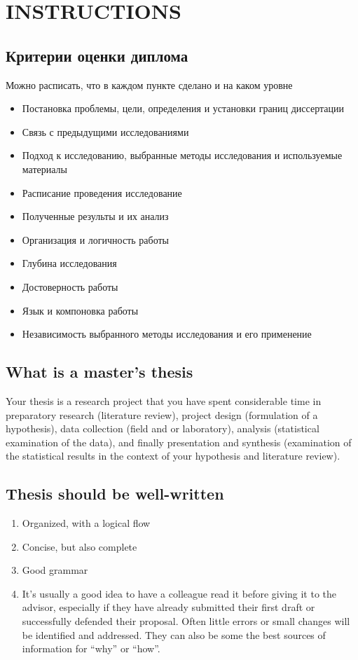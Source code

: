 \section*{INSTRUCTIONS}

\subsection{Критерии оценки диплома}

\begin{suggestions}
Можно расписать, что в каждом пункте сделано и на каком уровне
\end{suggestions}

\begin{itemize}
  \item Постановка проблемы, цели, определения и установки границ диссертации
  \item Связь с предыдущими исследованиями
  \item Подход к исследованию, выбранные методы исследования и используемые материалы
  \item Расписание проведения исследование
  \item Полученные результы и их анализ
  \item Организация и логичность работы
  \item Глубина исследования
  \item Достоверность работы
  \item Язык и компоновка работы
  \item Независимость выбранного методы исследования и его применение
\end{itemize}

\subsection*{What is a master's thesis}
Your  thesis is a research project that you have spent considerable time in preparatory research
(literature review), project design (formulation of a hypothesis), data collection (field and or 
laboratory), analysis (statistical examination of the data), and finally presentation and synthesis
(examination of the statistical results in the context of your hypothesis and literature review). 

\subsection*{Thesis should be well-written}
\begin{enumerate}
	\item Organized, with a logical flow 
	\item Concise, but also complete
	\item Good grammar
	\item It’s usually a good idea to have a colleague read it before giving it to the advisor,
	especially if they have already submitted their first draft or successfully defended their
	proposal. Often little errors or small changes will be identified and addressed. 
	They can also be some the best sources of information for “why” or “how”. 
\end{enumerate}

